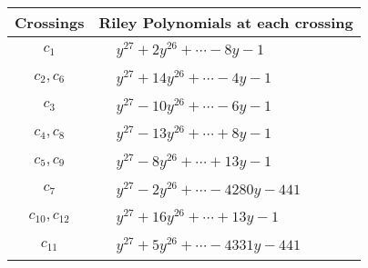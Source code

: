 \documentclass[1p]{elsarticle_modified}
\theoremstyle{definition}
\begin{document}
\begin{tabular}{m{50pt}|m{274pt}}
Crossings & \hspace{64pt}Riley Polynomials at each crossing \\
\hline $$\begin{aligned}c_{1}\end{aligned}$$&$\begin{aligned}
&y^{27}+2 y^{26}+\cdots-8 y-1
\end{aligned}$\\
\hline $$\begin{aligned}c_{2},c_{6}\end{aligned}$$&$\begin{aligned}
&y^{27}+14 y^{26}+\cdots-4 y-1
\end{aligned}$\\
\hline $$\begin{aligned}c_{3}\end{aligned}$$&$\begin{aligned}
&y^{27}-10 y^{26}+\cdots-6 y-1
\end{aligned}$\\
\hline $$\begin{aligned}c_{4},c_{8}\end{aligned}$$&$\begin{aligned}
&y^{27}-13 y^{26}+\cdots+8 y-1
\end{aligned}$\\
\hline $$\begin{aligned}c_{5},c_{9}\end{aligned}$$&$\begin{aligned}
&y^{27}-8 y^{26}+\cdots+13 y-1
\end{aligned}$\\
\hline $$\begin{aligned}c_{7}\end{aligned}$$&$\begin{aligned}
&y^{27}-2 y^{26}+\cdots-4280 y-441
\end{aligned}$\\
\hline $$\begin{aligned}c_{10},c_{12}\end{aligned}$$&$\begin{aligned}
&y^{27}+16 y^{26}+\cdots+13 y-1
\end{aligned}$\\
\hline $$\begin{aligned}c_{11}\end{aligned}$$&$\begin{aligned}
&y^{27}+5 y^{26}+\cdots-4331 y-441
\end{aligned}$\\
\hline
\end{tabular}\\~\\
\end{document}
